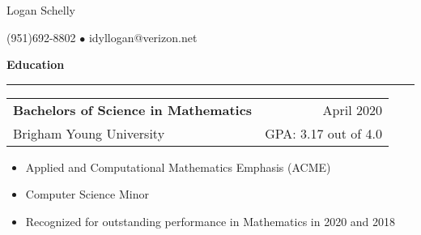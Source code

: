 \documentclass{article}
\newenvironment{compactItemize}{
  \begin{itemize}[itemsep=0ex, parsep=0ex, partopsep=0ex, topsep= -7pt]
}{
  \end{itemize}
}
\newcommand{\jobInfo}[4]{
  \begingroup
  \setlength{\tabcolsep}{0ex}
  \begin{tabularx}{\linewidth}{X r}
    #1 & %
    #2\\ %
    #3 & %
    #4   %
  \end{tabularx}%
  \endgroup%
}
\newcommand{\degree}[4]{
  \jobInfo{\textbf{#1}}{#2}{#3}{#4}
}
\begin{document}
\begin{center}
{\Large Logan Schelly} %

(951)\phantom{-}692-8802 %
$\bullet$ %
idyllogan@verizon.net %
\end{center}
\begin{comment}
\textbf{Objective}
\smallskip
\hrule
I am a recent graduate.
My ultimate career goal would be to work on a project like Intel's Math Kernel Library.
For the time being I am looking for an entry-level job in software, data, or (if possible) high performance computing.
\end{comment}
\textbf{Education}
\smallskip
\hrule

\degree{Bachelors of Science in Mathematics}{April 2020}{Brigham Young University}{GPA: 3.17 out of 4.0}
%
\vspace{-1ex}
\begin{compactItemize}
  \item Applied and Computational Mathematics Emphasis (ACME)
  \item Computer Science Minor
  \item Recognized for outstanding performance in Mathematics in 2020 and 2018
\end{compactItemize}
\end{document}

